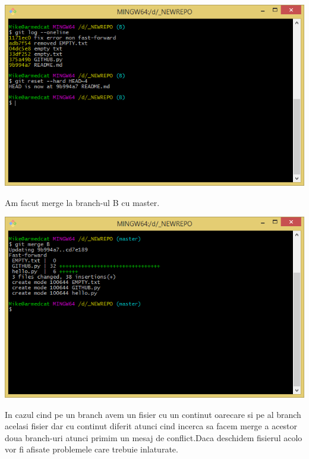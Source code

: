 \begin{center}
\includegraphics[scale=0.7]{images/git_reset}
\end{center}
Am facut merge la branch-ul B cu master.
\begin{center}
\includegraphics[scale=0.7]{images/git_merge_B}
\end{center}
In cazul cind pe un branch avem un fisier cu un continut oarecare si pe al branch acelasi fisier dar cu continut diferit atunci cind incerca sa facem merge a acestor doua branch-uri atunci primim un mesaj de conflict.Daca deschidem fisierul acolo vor fi afisate problemele care trebuie inlaturate.
